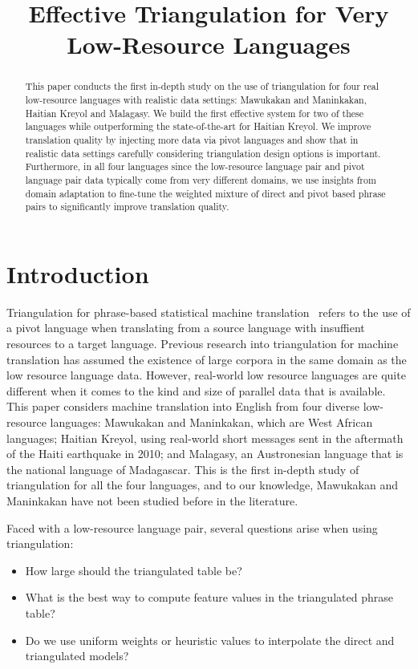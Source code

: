 \documentclass[11pt]{article}
\title{Effective Triangulation for Very Low-Resource Languages}
\author{}
\date{}
\begin{document}
\maketitle

\begin{abstract}
This paper conducts the first in-depth study on the use of triangulation for four real low-resource languages with realistic data settings: Mawukakan and Maninkakan, Haitian Kreyol and Malagasy. We build the first effective system for two of these languages while outperforming the state-of-the-art for Haitian Kreyol. We improve translation quality by injecting more data via pivot languages and show that in realistic data settings carefully considering triangulation design options is important. Furthermore, in all four languages since the low-resource language pair and pivot language pair data typically come from very different domains, we use insights from domain adaptation to fine-tune the weighted mixture of direct and pivot based phrase pairs to significantly improve translation quality.
\end{abstract}

\section{Introduction}
Triangulation for phrase-based statistical machine translation~\cite{Utiyama:07,Cohn:07} refers to the use of a pivot language when translating from a source language with insuffient resources to a target language. Previous research into triangulation for machine translation has assumed the existence of large corpora in the same domain as the low resource language data. However, real-world low resource languages are quite different when it comes to the kind and size of parallel data that is available. This paper considers machine translation into English from four diverse low-resource languages: Mawukakan and Maninkakan, which are West African languages;  Haitian Kreyol, using real-world short messages sent in the aftermath of the Haiti earthquake in 2010; and Malagasy, an Austronesian language that is the national language of Madagascar. This is the first in-depth study of triangulation for all the four languages, and to our knowledge, Mawukakan and Maninkakan have not been studied before in the literature.

Faced with a low-resource language pair, several questions arise when using triangulation: 
\begin{itemize}\addtolength{\itemsep}{-0.4\baselineskip}
	\item How large should the triangulated table be? 
	\item What is the best way to compute feature values in the triangulated phrase table? 
	\item Do we use uniform weights or heuristic values to interpolate the direct and triangulated models? 
\end{itemize}
\end{document}
